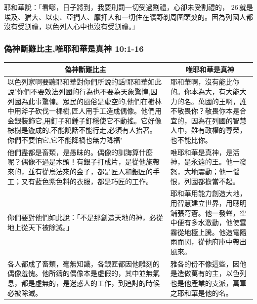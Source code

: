 耶和華說：「看哪，日子將到，我要刑罰一切受過割禮，心卻未受割禮的， 26 就是埃及、猶大、以東、亞捫人、摩押人和一切住在曠野剃周圍頭髮的。因為列國人都沒有受割禮，以色列人心中也沒有受割禮。」




\subsubsection{偽神斷難比主,唯耶和華是真神 10:1-16}
\begin{table}[H]
\centering
\begin{tabular}{p{10.8cm}|p{6.50cm}}\hline\hline
\multicolumn{1}{c|}{偽神斷難比主}&\multicolumn{1}{c}{唯耶和華是真神}\\\hline
以色列家啊要聽耶和華對你們所說的話!耶和華如此說"你們不要效法列國的行為也不要為天象驚惶,因列國為此事驚惶。眾民的風俗是虛空的,他們在樹林中用斧子砍伐一棵樹,匠人用手工造成偶像。他們用金銀裝飾它,用釘子和錘子釘穩使它不動搖。它好像棕樹是鏇成的,不能說話不能行走,必須有人抬著。你們不要怕它,它不能降禍也無力降福"
&耶和華啊，沒有能比你的。你本為大，有大能大力的名。萬國的王啊，誰不敬畏你？敬畏你本是合宜的，因為在列國的智慧人中，雖有政權的尊榮，也不能比你。\\\hline
他們盡都是畜類，是愚昧的。偶像的訓誨算什麼呢？偶像不過是木頭！有銀子打成片，是從他施帶來的，並有從烏法來的金子，都是匠人和銀匠的手工；又有藍色紫色料的衣服，都是巧匠的工作。 
&唯耶和華是真神，是活神，是永遠的王。他一發怒，大地震動；他一惱恨，列國都擔當不起。\\\hline
你們要對他們如此說：「不是那創造天地的神，必從地上從天下被除滅。」
&耶和華用能力創造大地，用智慧建立世界，用聰明鋪張穹蒼。他一發聲，空中便有多水激動，他使雲霧從地極上騰。他造電隨雨而閃，從他府庫中帶出風來。\\\hline
各人都成了畜類，毫無知識，各銀匠都因他雕刻的偶像羞愧。他所鑄的偶像本是虛假的，其中並無氣息，都是虛無的，是迷惑人的工作，到追討的時候必被除滅。&雅各的份不像這些，因他是造做萬有的主，以色列也是他產業的支派，萬軍之耶和華是他的名。\\\hline
\end{tabular}
\end{table}


